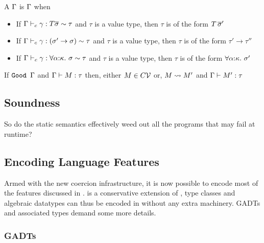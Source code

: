 \documentclass[manuscript,screen,nonacm]{acmart}
\begin{document}
\begin{definition}[\Good $\TEnv$]
  A $\TEnv$ is \Good $\TEnv$ when
  \begin{itemize}
  \item If $\Gamma \vdash_{c} \gamma : T \overline{\sigma} \sim \tau$ and $\tau$ is a value type, then $\tau$ is of the form $T\,\overline{\sigma}'$
  \item If $\Gamma \vdash_{c} \gamma : (\sigma' \to \sigma) \sim \tau$ and $\tau$ is a value type, then $\tau$ is of the form $\tau' \to \tau''$
  \item If $\Gamma \vdash_{c} \gamma : \forall\alpha{:}\kappa.~\sigma \sim \tau$ and $\tau$ is a value type, then $\tau$ is of the form $\forall\alpha{:}\kappa.~\sigma'$
  \end{itemize}
\end{definition}

\begin{theorem}\label{thm:progress}
  If $\texttt{Good }\Gamma$ and $\Gamma \vdash M : \tau$ then, either $M \in C\mathcal{V}$ or, $M \rightsquigarrow M'$ and
  $\Gamma \vdash M' : \tau$
\end{theorem}


\subsection{Soundness}
So do the static semantics effectively weed out all the programs that may fail at runtime?


\subsection{Encoding Language Features}

Armed with the new coercion infrastructure, it is now possible to encode most of the features discussed in . \SFC is a conservative extension of \SF, type classes and algebraic datatypes can thus be encoded in \SFC without any extra machinery. GADTs and associated types demand some more details.

\subsubsection{GADTs}
\end{document}
